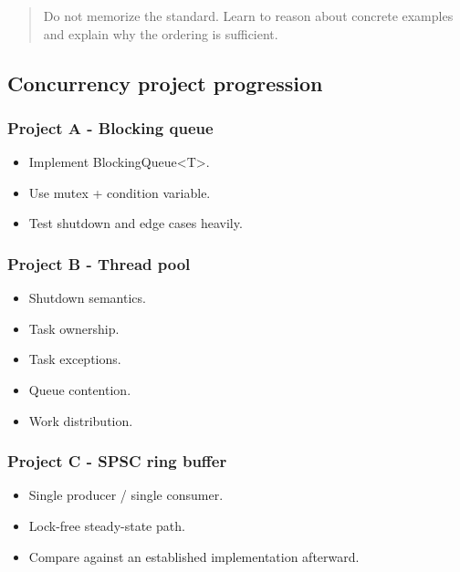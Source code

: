 \documentclass[11pt,letterpaper]{article}
\begin{document}
\begin{quote}
Do not memorize the standard. Learn to reason about concrete examples and explain why the ordering is sufficient.
\end{quote}

\subsection*{Concurrency project progression}

\subsubsection*{Project A - Blocking queue}

\begin{itemize}

\item Implement BlockingQueue<T>.

\item Use mutex + condition variable.

\item Test shutdown and edge cases heavily.

\end{itemize}

\subsubsection*{Project B - Thread pool}

\begin{itemize}

\item Shutdown semantics.

\item Task ownership.

\item Task exceptions.

\item Queue contention.

\item Work distribution.

\end{itemize}

\subsubsection*{Project C - SPSC ring buffer}

\begin{itemize}

\item Single producer / single consumer.

\item Lock-free steady-state path.

\item Compare against an established implementation afterward.

\end{itemize}
\end{document}
